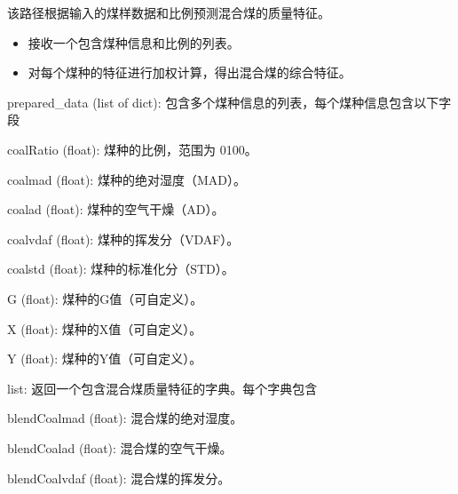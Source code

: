 \documentclass[a4paper,12pt,english]{sphinxmanual}
\begin{document}

\begin{fulllineitems}
\label{\detokenize{api/login:login.predictBlendCoal}}
\pysigstartsignatures
{}
\pysigstopsignatures
\sphinxAtStartPar
该路径根据输入的煤样数据和比例预测混合煤的质量特征。
\begin{description}
\begin{itemize}
\item {} 
\sphinxAtStartPar
接收一个包含煤种信息和比例的列表。

\item {} 
\sphinxAtStartPar
对每个煤种的特征进行加权计算，得出混合煤的综合特征。

\end{itemize}

\sphinxAtStartPar
prepared\_data (list of dict): 包含多个煤种信息的列表，每个煤种信息包含以下字段

\begin{sphinxVerbatim}[commandchars=\\\{\}]
coalRatio (float): 煤种的比例，范围为 0\PYGZhy{}100。

coal\PYGZus{}mad (float): 煤种的绝对湿度（MAD）。

coal\PYGZus{}ad (float): 煤种的空气干燥（AD）。

coal\PYGZus{}vdaf (float): 煤种的挥发分（VDAF）。

coal\PYGZus{}std (float): 煤种的标准化分（STD）。

G (float): 煤种的G值（可自定义）。

X (float): 煤种的X值（可自定义）。

Y (float): 煤种的Y值（可自定义）。
\end{sphinxVerbatim}

\sphinxAtStartPar
list: 返回一个包含混合煤质量特征的字典。每个字典包含

\begin{sphinxVerbatim}[commandchars=\\\{\}]
blendCoal\PYGZus{}mad (float): 混合煤的绝对湿度。

blendCoal\PYGZus{}ad (float): 混合煤的空气干燥。

blendCoal\PYGZus{}vdaf (float): 混合煤的挥发分。


\end{sphinxVerbatim}
\end{description}
\end{fulllineitems}
\end{document}
